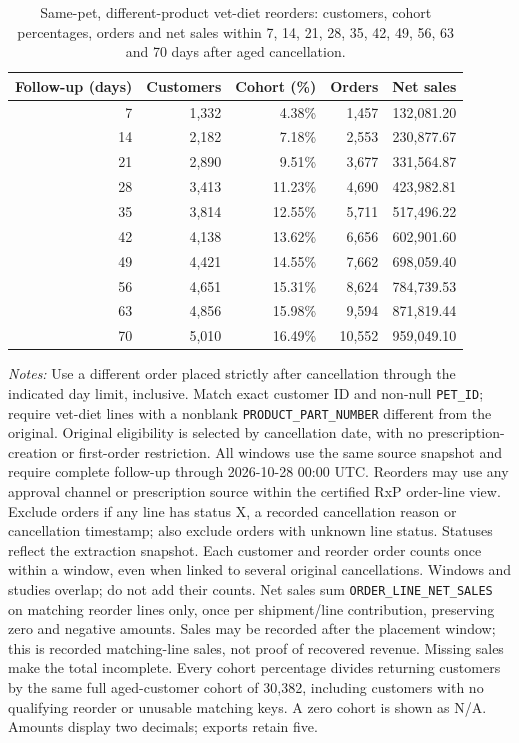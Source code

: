 \begin{table}[!htbp]
\centering
\caption{Same-pet, different-product vet-diet reorders: customers, cohort percentages, orders and net sales within 7, 14, 21, 28, 35, 42, 49, 56, 63 and 70 days after aged cancellation.}
\label{tab:financial-opportunity-reorder-same-pet-different-part}
\begin{tabular}{@{}rrrrr@{}}
\toprule
Follow-up (days) & Customers & Cohort (\%) & Orders & Net sales \\
\midrule
7 & 1,332 & 4.38\% & 1,457 & 132,081.20 \\
14 & 2,182 & 7.18\% & 2,553 & 230,877.67 \\
21 & 2,890 & 9.51\% & 3,677 & 331,564.87 \\
28 & 3,413 & 11.23\% & 4,690 & 423,982.81 \\
35 & 3,814 & 12.55\% & 5,711 & 517,496.22 \\
42 & 4,138 & 13.62\% & 6,656 & 602,901.60 \\
49 & 4,421 & 14.55\% & 7,662 & 698,059.40 \\
56 & 4,651 & 15.31\% & 8,624 & 784,739.53 \\
63 & 4,856 & 15.98\% & 9,594 & 871,819.44 \\
70 & 5,010 & 16.49\% & 10,552 & 959,049.10 \\
\bottomrule
\end{tabular}

\begin{minipage}{\linewidth}
\footnotesize
\textit{Notes:} Use a different order placed strictly after cancellation through the indicated day limit, inclusive. Match exact customer ID and non-null \texttt{PET\_ID}; require vet-diet lines with a nonblank \texttt{PRODUCT\_PART\_NUMBER} different from the original. Original eligibility is selected by
cancellation date, with no prescription-creation or first-order restriction.
All windows use the same source snapshot and require complete follow-up through
2026-10-28 00:00 UTC. Reorders may use any approval channel or prescription
source within the certified RxP order-line view. Exclude orders if any line has
status X, a recorded cancellation reason or cancellation timestamp; also exclude
orders with unknown line status. Statuses reflect the extraction snapshot.
Each customer and reorder order counts once within a window, even when linked
to several original cancellations. Windows and studies overlap; do not add their counts.
Net sales sum \texttt{ORDER\_LINE\_NET\_SALES} on matching reorder lines only,
once per shipment/line contribution, preserving zero and negative amounts.
Sales may be recorded after the placement window; this is recorded matching-line
sales, not proof of recovered revenue. Missing sales make the total incomplete.
Every cohort percentage divides returning customers by the same full aged-customer cohort of 30,382, including customers with no qualifying reorder or unusable matching keys. A zero cohort is shown as N/A. Amounts display two decimals; exports retain five.
\end{minipage}
\end{table}

